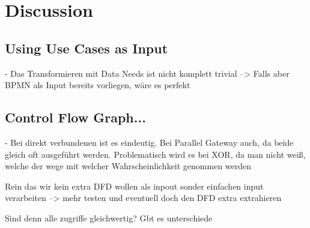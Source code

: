 \chapter{Discussion}
\label{ch:Discussion}

\section{Using Use Cases as Input}
- Das Transformieren mit Data Needs ist nicht komplett trivial --> Falls aber BPMN als Input bereits vorliegen, wäre es perfekt

\section{Control Flow Graph...}
- Bei direkt verbundenen ist es eindeutig. Bei Parallel Gateway auch, da beide gleich oft ausgeführt werden. Problematisch wird es bei XOR, da man nicht weiß, welche der wege mit welcher Wahrscheinlichkeit genommen werden



Rein das wir kein extra DFD wollen als inpout sonder einfachen input verarbeiten --> mehr testen und eventuell doch den DFD extra extrahieren


Sind denn alle zugriffe gleichwertig? Gbt es unterschiede